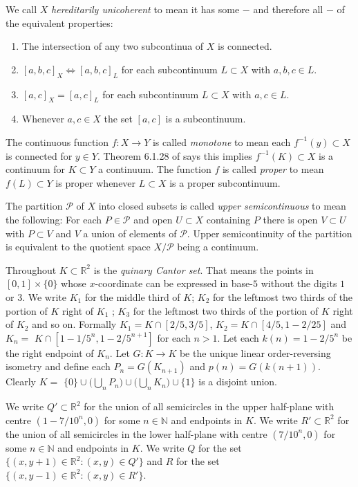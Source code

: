 \documentclass[12pt]{article}
\theoremstyle{plain}
\theoremstyle{definition}
\newcommand{\RR}{\ensuremath{\mathbb R}}
\newcommand{\NN}{\ensuremath{\mathbb N}}
\newcommand{\0}{\ensuremath{\varnothing}}
\newcommand{\cP}{\ensuremath{\mathcal P}}
\begin{document}
	
	
	We call $X$ \textit{hereditarily unicoherent} to mean it has some $-$ and therefore all $-$ of the equivalent properties:
	
	\begin{enumerate}[label=(\Roman*)]
		\item The intersection of any two subcontinua of $X$ is connected.
		\item $[a,b,c]_X \iff [a,b,c]_L$ for each subcontinuum $L \subset X$ with $a,b,c \in L$.
		\item $[a,c]_X = [a,c]_L$ for each subcontinuum $L \subset X$ with $a,c \in L$.
		\item Whenever $a,c \in X$ the set $[a,c]$ is a subcontinuum.
	\end{enumerate}
	
	
	The continuous function $f:X \to Y$ is called \textit{monotone} to mean each $f^{-1}(y) \subset X$ is connected for $y \in Y$.
	Theorem 6.1.28 of \cite{Engelking} says this implies $f^{-1}(K) \subset X$ is a continuum for  $K \subset Y$ a continuum.
	The function $f$ is called \textit{proper} to mean $f(L) \subset Y$ is proper whenever $L \subset X$ is a proper subcontinuum.
	
	The partition $\cP$ of $X$ into closed subsets is called \textit{upper semicontinuous} to mean the following:
	For each $P \in \cP$ and open $U \subset X$ containing $P$ there is open $V \subset U$ with $P \subset V$ and $V$ a union of elements of $\cP$.
	Upper semicontinuity of the partition is equivalent to the quotient space $X/\cP$ being a continuum.
	
	Throughout $K \subset \RR^2$ is the \textit{quinary Cantor set}.
	That means the points in $[0,1] \times \{0\}$ whose $x$-coordinate can be expressed in base-$5$ without the digits $1$ or $3$. 
	We write $K_1$ for the middle third of $K$; $K_2$ for the leftmost two thirds of the portion of $K$ right of $K_1$ ; $K_3$ for the leftmost two thirds of the portion of $K$ right of $K_2$ and so on.
	Formally $K_1 = K \cap [2/5,3/5]$, $K_2 = K \cap[4/5, 1-2/25]$ and $K_n =$ \mbox{$K \cap [1-1/5^n, 1-2/5^{n+1}]$} for each $n > 1$.
	Let each $k(n) = 1 -2/5^n$ be the right endpoint of $K_n$.
	Let $G: K \to K $ be the unique linear order-reversing isometry
	and define each $P_n = G(K_{n+1})$ and $p(n) = G(k(n+1))$.
	Clearly $K = $ \mbox{$\{0\} \cup \big ( \bigcup_n P_n \big ) \cup \big ( \bigcup_n K_n \big ) \cup \{1\}$} is a disjoint union.
	
	
	We write $Q' \subset \RR^2$ for the union of all semicircles in the upper half-plane with centre $(1- 7/10^n,0)$ for some $n \in \NN$  
	and endpoints in $K$.
	We write $R' \subset \RR^2$ for the union of all semicircles in the lower half-plane with centre $(7/10^n,0)$ for some $n \in \NN$ 
	and endpoints in $K$.
	We write $Q$ for the set $\{(x,y+1) \in \RR^2: (x,y) \in Q'\}$
	and $R$ for the set $\{(x,y-1) \in \RR^2: (x,y) \in R'\}$.
	
\end{document}
